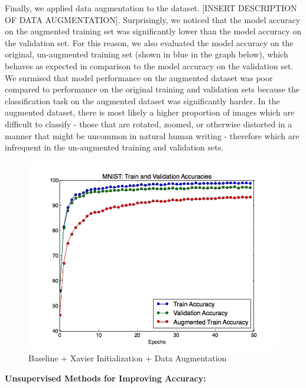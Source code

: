 \documentclass[a4paper]{article}
\begin{document}
\begin{enumerate}
{Finally, we applied data augmentation to the dataset. [INSERT DESCRIPTION OF DATA AUGMENTATION]. 
\newline
\newline
Surprisingly, we noticed that the model accuracy on the augmented training set was significantly lower than the model accuracy on the validation set. For this reason, we also evaluated the model accuracy on the original, un-augmented training set (shown in blue in the graph below), which behaves as expected in comparison to the model accuracy on the validation set. We surmised that model performance on the augmented dataset was poor compared to performance on the original training and validation sets because the classification task on the augmented dataset was significantly harder. In the augmented dataset, there is most likely a higher proportion of images which are difficult to classify - those that are rotated, zoomed, or otherwise distorted in a manner that might be uncommon in natural human writing - therefore which are infrequent in the un-augmented training and validation sets. 

\begin{figure}
  \includegraphics[width=12cm]{../plots/accuracies_augmented.jpg}
  \centering
  \caption{Baseline + Xavier Initialization + Data Augmentation}
  \label{fig:boat1}
\end{figure}

\textbf{Unsupervised Methods for Improving Accuracy:}
\newline
{}
}
\end{enumerate}
\end{document}
